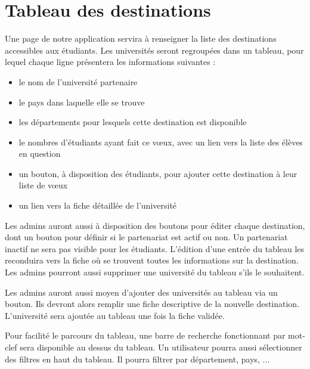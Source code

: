 \section{Tableau des destinations}
Une page de notre application servira à renseigner la liste des destinations accessibles aux étudiants.
Les universités seront regroupées dans un tableau, pour lequel chaque ligne présentera les informations suivantes :
 \begin{itemize}
 	\item le nom de l'université partenaire
 	\item le pays dans laquelle elle se trouve
 	\item les départements pour lesquels cette destination est disponible
 	\item le nombres d'étudiants ayant fait ce vœux, avec un lien vers la liste des élèves en question
 	\item un bouton, à disposition des étudiants, pour ajouter cette destination à leur liste de vœux
 	\item un lien vers la fiche détaillée de l'université
 \end{itemize}
 
 Les admins auront aussi à disposition des boutons pour éditer chaque destination, dont un bouton pour définir si le partenariat est actif ou non. Un partenariat inactif ne sera pas visible pour les étudiants.
 L'édition d'une entrée du tableau les reconduira vers la fiche où se trouvent toutes les informations sur la destination.
 Les admins pourront aussi supprimer une université du tableau s'ils le souhaitent.
 
 Les admins auront aussi moyen d'ajouter des universités au tableau via un bouton. Ils devront alors remplir une fiche descriptive de la nouvelle destination. L'université sera ajoutée au tableau une fois la fiche validée.
 
 Pour facilité le parcours du tableau, une barre de recherche fonctionnant par mot-clef sera disponible au dessus du tableau. Un utilisateur pourra aussi sélectionner des filtres en haut du tableau. Il pourra filtrer par département, pays, ...